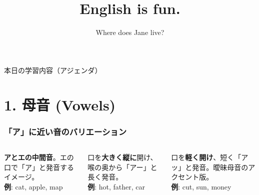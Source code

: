 \documentclass[aspectratio=169,xcolor={dvipsnames,table}]{beamer}
\title{English is fun.}
\subtitle{Where does Jane live?}
\author{}
\institute[]{}
\date[]
\newcommand{\gstyle}[1]{\textbf{\textcolor{primaryblue}{#1}}}
\begin{document}
\begin{frame}
    \titlepage
\end{frame}

\begin{frame}{本日の学習内容（アジェンダ）}
    \tableofcontents
\end{frame}

\section{1. 母音 (Vowels)}

\begin{frame}
    \frametitle{「ア」に近い音のバリエーション}
    \begin{columns}[T,totalwidth=\textwidth]
        \begin{column}{.3\textwidth}
            \begin{block}{\textipa{/\ae /}}
                \gstyle{アとエの中間音}。エの口で「ア」と発音するイメージ。\\ \vspace{0.3cm}
                \textbf{例}: cat, apple, map
            \end{block}
        \end{column}
        \begin{column}{.3\textwidth}
            \begin{block}{\textipa{/\textscripta :/}}
                口を\textbf{大きく縦に}開け、喉の奥から「アー」と長く発音。\\ \vspace{0.3cm}
                \textbf{例}: hot, father, car
            \end{block}
        \end{column}
        \begin{column}{.3\textwidth}
            \begin{block}{}
                口を\textbf{軽く開け}、短く「アッ」と発音。曖昧母音のアクセント版。\\ \vspace{0.3cm}
                \textbf{例}: cut, sun, money
            \end{block}
        \end{column}
    \end{columns}
\end{frame}
\end{document}
